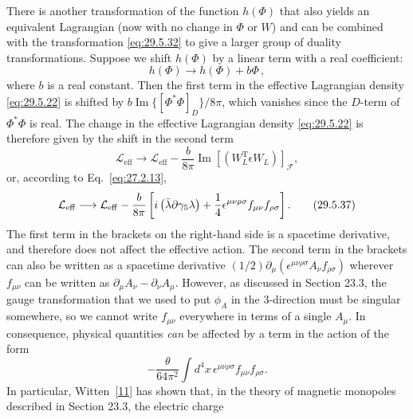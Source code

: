 There is another transformation of the function \(h(\Phi)\) that also yields
an equivalent Lagrangian (now with no change in \(\Phi\) or \(W\)) and can be
combined with the transformation \eqref{eq:29.5.32} to give a larger group of
duality transformations. Suppose we shift \(h(\Phi)\) by a linear term with
a real coefficient:
\begin{equation}
  h(\Phi)\longrightarrow h(\Phi)+b\Phi\,,
  \tag{29.5.35}\label{eq:29.5.35}
\end{equation}
where \(b\) is a real constant. Then the first term in the effective
Lagrangian density \eqref{eq:29.5.22} is shifted by
\(b\operatorname{Im}\{[\Phi^*\Phi]_D\}/8\pi\), which vanishes since the
\(D\)-term of \(\Phi^*\Phi\) is real. The change in the effective Lagrangian
density \eqref{eq:29.5.22} is therefore given by the shift in the second term
\begin{equation}
  \mathcal{L}_{\mathrm{eff}}\longrightarrow\mathcal{L}_{\mathrm{eff}}
  -\frac{b}{8\pi}\operatorname{Im}
    \left[\left(W_L^{\mathrm T}\epsilon W_L\right)\right]_{\mathcal F},
  \tag{29.5.36}\label{eq:29.5.36}
\end{equation}
or, according to Eq.~\eqref{eq:27.2.13},
\begin{equation}
  \mathcal{L}_{\mathrm{eff}}\longrightarrow\mathcal{L}_{\mathrm{eff}}
  -\frac{b}{8\pi}\left[
    i\left(\bar\lambda\sl{\partial}\gamma_5\lambda\right)
    +\frac14\epsilon^{\mu\nu\rho\sigma}f_{\mu\nu}f_{\rho\sigma}
  \right].
  \tag{29.5.37}\label{eq:29.5.37}
\end{equation}
The first term in the brackets on the right-hand side is a spacetime
derivative, and therefore does not affect the effective action. The second
term in the brackets can also be written as a spacetime derivative
\((1/2)\partial_\mu(\epsilon^{\mu\nu\rho\sigma}A_\nu f_{\rho\sigma})\)
wherever \(f_{\mu\nu}\) can be written as
\(\partial_\mu A_\nu-\partial_\nu A_\mu\). However, as discussed in Section
23.3, the gauge transformation that we used to put \(\phi_A\) in the
3-direction must be singular somewhere, so we cannot write \(f_{\mu\nu}\)
everywhere in terms of a single \(A_\mu\). In consequence, physical
quantities \textit{can} be affected by a term in the action of the form
\begin{equation}
  -\frac{\theta}{64\pi^2}\int d^4x\,
    \epsilon^{\mu\nu\rho\sigma}f_{\mu\nu}f_{\rho\sigma}.
  \tag{29.5.38}\label{eq:29.5.38}
\end{equation}
In particular, Witten~\hyperref[ch29-ref-11]{[11]} has shown that, in the
theory of magnetic monopoles described in Section 23.3, the electric charge
